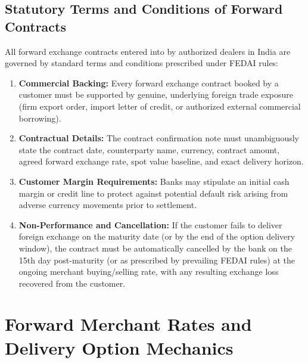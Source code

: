 \subsection{Statutory Terms and Conditions of Forward Contracts}
All forward exchange contracts entered into by authorized dealers in India are governed by standard terms and conditions prescribed under FEDAI rules:
\begin{enumerate}[leftmargin=*]
    \item \textbf{Commercial Backing:} Every forward exchange contract booked by a customer must be supported by genuine, underlying foreign trade exposure (firm export order, import letter of credit, or authorized external commercial borrowing).
    \item \textbf{Contractual Details:} The contract confirmation note must unambiguously state the contract date, counterparty name, currency, contract amount, agreed forward exchange rate, spot value baseline, and exact delivery horizon.
    \item \textbf{Customer Margin Requirements:} Banks may stipulate an initial cash margin or credit line to protect against potential default risk arising from adverse currency movements prior to settlement.
    \item \textbf{Non-Performance and Cancellation:} If the customer fails to deliver foreign exchange on the maturity date (or by the end of the option delivery window), the contract must be automatically cancelled by the bank on the 15th day post-maturity (or as prescribed by prevailing FEDAI rules) at the ongoing merchant buying/selling rate, with any resulting exchange loss recovered from the customer.
\end{enumerate}

\section{Forward Merchant Rates and Delivery Option Mechanics}

